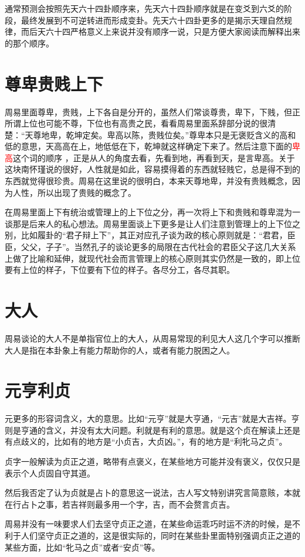 \documentclass[12pt,oneside]{book}
\renewcommand{\emph}[1]{\textcolor{red}{#1}}
\begin{document}
通常预测会按照先天六十四卦顺序来，先天六十四卦顺序就是在变爻到六爻的阶段，最终发展到不可逆转进而形成变卦。先天六十四卦更多的是揭示天理自然规律，而后天六十四严格意义上来说并没有顺序一说，只是方便大家阅读而解释出来的那个顺序。

\section{尊卑贵贱上下}
周易里面尊卑，贵贱，上下各自是分开的，虽然人们常谈尊贵，卑下，下贱，但正所谓上位也可能不尊，下位也有高贵之民，看看周易里面系辞部分说的很清楚：“天尊地卑，乾坤定矣。卑高以陈，贵贱位矣。”尊卑本只是无褒贬含义的高和低的意思，天高高在上，地低低在下，乾坤就这样确定下来了。然后注意下面的\emph{卑高}这个词的顺序 ，正是从人的角度去看，先看到地，再看到天，是言卑高。关于这块南怀瑾说的很好，人性就是如此，容易摸得着的东西就轻贱它，总是得不到的东西就觉得很珍贵。周易在这里说的很明白，本来天尊地卑，并没有贵贱概念，因为人性，所以出现了贵贱的概念了。

在周易里面上下有统治或管理上的上下位之分，再一次将上下和贵贱和尊卑混为一谈那是后来人的私心想法。周易里面谈上下更多是让人们注意到管理上的上下位之别，比如履卦的“君子辩上下”，其正对应孔子谈为政的核心原则就是：“君君，臣臣，父父，子子”。当然孔子的谈论更多的局限在古代社会的君臣父子这几大关系上做了比喻和延伸，就现代社会而言管理上的核心原则其实仍然是一致的，即上位要有上位的样子，下位要有下位的样子。各尽分工，各尽其职。

\section{大人}
周易谈论的大人不是单指官位上的大人，从周易常现的利见大人这几个字可以推断大人是指在本卦象上有能力帮助你的人，或者有能力脱困之人。

\section{元亨利贞}
元更多的形容词含义，大的意思。比如“元亨”就是大亨通，“元吉”就是大吉祥。亨则是亨通的含义，并没有太大问题。利就是有利的意思。就是这个贞在解读上还是有点歧义的，比如有的地方是“小贞吉，大贞凶。”，有的地方是“利牝马之贞”。

贞字一般解读为贞正之道，略带有点褒义，在某些地方可能并没有褒义，仅仅只是表示个人贞固自守其道。

然后我否定了认为贞就是占卜的意思这一说法，古人写文特别讲究言简意赅，本就在行占卜之事，若吉祥则最多用一个字，吉，而不会赘言贞吉。

周易并没有一味要求人们去坚守贞正之道，在某些命运乖巧时运不济的时候，是不利于人们坚守贞正之道的，这是很实际的，同时在某些卦里面特别强调贞正之道的某些方面，比如“牝马之贞”或者“安贞”等。
\end{document}
